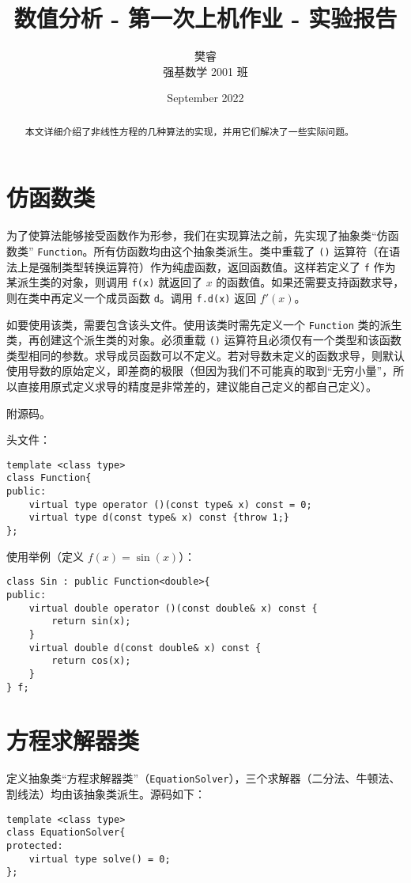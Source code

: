 \documentclass{ctexart}
\title{数值分析 - 第一次上机作业 - 实验报告}
\author{樊睿 \\ 强基数学 2001 班}
\date{September 2022}
\begin{document}
\maketitle

\begin{abstract}
本文详细介绍了非线性方程的几种算法的实现，并用它们解决了一些实际问题。
\end{abstract}

\section{仿函数类}
为了使算法能够接受函数作为形参，我们在实现算法之前，先实现了抽象类“仿函数类” \verb|Function|。所有仿函数均由这个抽象类派生。类中重载了 \verb|()| 运算符（在语法上是强制类型转换运算符）作为纯虚函数，返回函数值。这样若定义了 \verb|f| 作为某派生类的对象，则调用 \verb|f(x)| 就返回了 $x$ 的函数值。如果还需要支持函数求导，则在类中再定义一个成员函数 \verb|d|。调用 \verb|f.d(x)| 返回 $f'(x)$。

如要使用该类，需要包含该头文件。使用该类时需先定义一个 \verb|Function| 类的派生类，再创建这个派生类的对象。必须重载 \verb|()| 运算符且必须仅有一个类型和该函数类型相同的参数。求导成员函数可以不定义。若对导数未定义的函数求导，则默认使用导数的原始定义，即差商的极限（但因为我们不可能真的取到“无穷小量”，所以直接用原式定义求导的精度是非常差的，建议能自己定义的都自己定义）。

附源码。

头文件：
\begin{verbatim}
template <class type>
class Function{
public:
    virtual type operator ()(const type& x) const = 0;
    virtual type d(const type& x) const {throw 1;}
};
\end{verbatim}

使用举例（定义 $f(x)=\sin(x)$）：
\begin{verbatim}
class Sin : public Function<double>{
public:
    virtual double operator ()(const double& x) const {
        return sin(x);
    }
    virtual double d(const double& x) const {
        return cos(x);
    }
} f;
\end{verbatim}

\section{方程求解器类}
定义抽象类“方程求解器类”（\verb|EquationSolver|），三个求解器（二分法、牛顿法、割线法）均由该抽象类派生。源码如下：

\begin{verbatim}
template <class type>
class EquationSolver{
protected:
    virtual type solve() = 0;
};
\end{verbatim}
\end{document}
